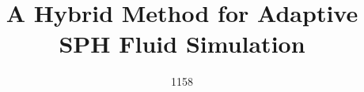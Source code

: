 

\title[ A Hybrid Method for Adaptive SPH Fluid Simulation ]%
      { A Hybrid Method for Adaptive SPH Fluid Simulation }

\author[1158]
       {1158
        \\
       }


%





